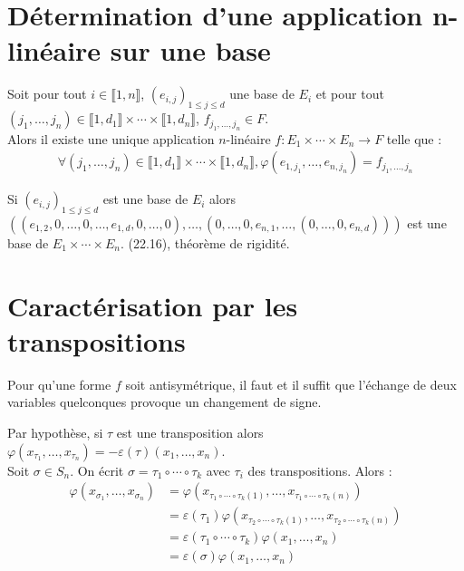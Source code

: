 \documentclass[../main.tex]{subfiles}
\begin{document}
\section{Détermination d'une application n-linéaire sur une base}
\begin{tcolorbox}[title=Propostion 30.11, title filled=false, colframe=lightblue, colback=lightblue!10!white]
    Soit pour tout $i\in \llbracket 1, n \rrbracket$, $(e_{i,j})_{1\leq j\leq d}$ une base de $E_i$ et pour tout $(j_1, \ldots, j_n)\in \llbracket 1, d_1 \rrbracket \times \cdots \times \llbracket 1, d_n \rrbracket$, $f_{j_1, \ldots, j_n}\in F$. \\
    Alors il existe une unique application $n$-linéaire $f:E_1\times \cdots \times E_n\to F$ telle que : 
    \begin{align*}
        \forall (j_1, \ldots, j_n)\in \llbracket 1, d_1 \rrbracket \times \cdots \times \llbracket 1, d_n \rrbracket, \varphi(e_{1,j_1}, \ldots, e_{n,j_n}) = f_{j_1, \ldots, j_n}
    \end{align*}
\end{tcolorbox}

\noindent Si $(e_{i,j})_{1\leq j\leq d}$ est une base de $E_i$ alors $((e_{1, 2}, 0, \ldots, 0, \ldots, e_{1, d}, 0, \ldots, 0), \ldots, (0, \ldots, 0, e_{n, 1}, \ldots, (0, \ldots, 0, e_{n, d})))$ est une base de $E_1\times \cdots \times E_n$. (22.16), théorème de rigidité. 

\section{Caractérisation par les transpositions}
\begin{tcolorbox}[title=Lemme 30.18, title filled=false, colframe=orange, colback=orange!10!white]
    Pour qu'une forme $f$ soit antisymétrique, il faut et il suffit que l'échange de deux variables quelconques provoque un changement de signe. 
\end{tcolorbox}

\noindent Par hypothèse, si $\tau$ est une transposition alors $\varphi(x_{\tau_1}, \ldots, x_{\tau_n}) = -\varepsilon(\tau)(x_1, \ldots, x_n)$. \\
Soit $\sigma\in S_n$. On écrit $\sigma = \tau_1\circ \cdots \circ\tau_k$ avec $\tau_i$ des transpositions. Alors : 
\begin{align*}
    \varphi(x_{\sigma_1}, \ldots, x_{\sigma_n}) &= \varphi(x_{\tau_1\circ\cdots\circ\tau_k(1)}, \ldots, x_{\tau_1\circ\cdots\circ\tau_k(n)}) \\
    &= \varepsilon(\tau_1) \varphi(x_{\tau_2\circ\cdots\circ\tau_k(1)}, \ldots, x_{\tau_2\circ\cdots\circ\tau_k(n)}) \\
    &= \varepsilon(\tau_1\circ \cdots \circ \tau_k) \varphi(x_1, \ldots, x_n) \\
    &= \varepsilon(\sigma) \varphi(x_1, \ldots, x_n)
\end{align*}
\end{document}
